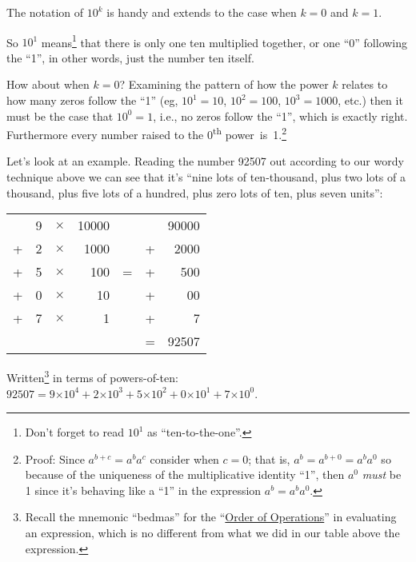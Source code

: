 \documentclass{article}
\begin{document}
The notation of $10^k$ is handy and extends
to the case when $k=0$ and $k=1$.

So $10^1$ means\footnote{Don't forget to read $10^1$
as ``ten-to-the-one''.} that there is only one ten multiplied together,
or one ``0'' following the ``1'',
in other words, just the number ten itself.

How about when $k=0$?
Examining the pattern of how the power $k$ relates to how many zeros follow the ``1''
(eg, $10^1=10$, $10^2=100$, $10^3=1000$,
etc.) then it must be the case that $10^0=1$,
i.e., no zeros follow the ``1'', which is exactly right.
Furthermore every number raised to the 0\textsuperscript{th}
power~is~1.\footnote{Proof: Since $a^{b+c}=a^ba^c$ consider when $c=0$; that is,
$a^b=a^{b+0}=a^ba^0$ so because of the uniqueness
of the multiplicative identity ``1'', then $a^0$ \emph{must} be 1 since it's behaving 
like a ``1'' in the expression $a^b=a^ba^0$.}

Let's look at an example.
Reading the number 92507 out according to our wordy technique above we can see
that it's ``nine lots of ten-thousand,
plus two lots of a thousand, plus five lots of a hundred,
plus zero lots of ten, plus seven units'':

\begin{center}
\begin{tabular}{r r r r c r r}
\phantom & 9 & $\times$ & 10000 & \phantom & \phantom & 90000\\
+ & 2 & $\times$ & 1000 & \phantom & + & 2000\\
+ & 5 & $\times$ & 100 & \; \; \; = \; \; \; & + & 500\\
+ & 0 & $\times$ & 10 & \phantom & + & 00\\
+ & 7 & $\times$ & 1 & \phantom & + & 7\\
\cline{6-7}
\phantom & \phantom & \phantom & \phantom & \phantom & = & 92507
\end{tabular}
\end{center}

Written\footnote{Recall the mnemonic ``bedmas'' for
the ``\href{https://en.wikipedia.org/wiki/Order_of_operations}{Order of Operations}'' in
evaluating an expression, which is no different from
what we did in our table above the expression.}
in terms of powers-of-ten:
$92507=9{\times{}}10^4+2{\times{}}10^3+5{\times{}}10^2+0{\times{}}10^1+7{\times{}}10^0$.
\end{document}
